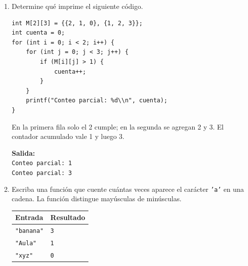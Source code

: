\begin{enumerate}[label=\textbf{\arabic*.}]
\begin{enumerate}[label=(\alph*)]
\item Escriba la condición de validez.
\ifpauta\begin{solucionbox}\texttt{codigo >= 1000 \&\& codigo <= 9999}.\end{solucionbox}\else\vspace{1.5cm}\fi
\item Escriba un \texttt{if-else} que imprima \texttt{Codigo valido} o \texttt{Codigo invalido}.
\ifpauta\begin{solucionbox}\begin{lstlisting}[style=customc]
if (codigo >= 1000 && codigo <= 9999) {
            printf("Codigo valido\n");
} else {
            printf("Codigo invalido\n");
}
\end{lstlisting}\end{solucionbox}\else\vspace{2cm}\fi
\item Clasifique \texttt{999}, \texttt{1000}, \texttt{4500} y \texttt{10000}.
\ifpauta\begin{solucionbox}999: inválido; 1000: válido; 4500: válido; 10000: inválido.\end{solucionbox}\else\vspace{2cm}\fi
\end{enumerate}
\newpage
\item Determine qué imprime el siguiente código.
\begin{lstlisting}[style=customc]
int M[2][3] = {{2, 1, 0}, {1, 2, 3}};
int cuenta = 0;
for (int i = 0; i < 2; i++) {
    for (int j = 0; j < 3; j++) {
        if (M[i][j] > 1) {
            cuenta++;
        }
    }
    printf("Conteo parcial: %d\\n", cuenta);
}
\end{lstlisting}
\ifpauta\begin{solucionbox}En la primera fila solo el 2 cumple; en la segunda se agregan 2 y 3. El contador acumulado vale 1 y luego 3.\par\textbf{Salida:}\\\texttt{Conteo parcial: 1}\\\texttt{Conteo parcial: 3}\end{solucionbox}\else\vspace{3cm}\fi
\item Escriba una función que cuente cuántas veces aparece el carácter \texttt{'a'} en una cadena. La función distingue mayúsculas de minúsculas.
\begin{center}\begin{tabular}{ll}\toprule\textbf{Entrada} & \textbf{Resultado}\\\midrule\texttt{"banana"} & \texttt{3}\\\texttt{"Aula"} & \texttt{1}\\\texttt{"xyz"} & \texttt{0}\\\bottomrule\end{tabular}\end{center}

\end{enumerate}
